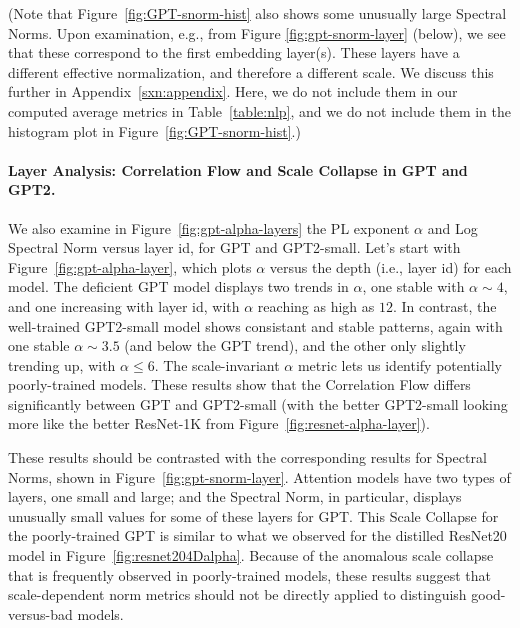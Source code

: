 (Note that Figure~\ref{fig:GPT-snorm-hist} also shows some unusually large Spectral Norms.
Upon examination, e.g., from Figure \ref{fig:gpt-snorm-layer} (below), we see that these correspond to the first embedding layer(s).
These layers have a different effective normalization, and therefore a different scale.
We discuss this further in Appendix~\ref{sxn:appendix}.
Here, we do not include them in our computed average metrics in Table~\ref{table:nlp}, and we do not include them in the histogram plot in Figure~\ref{fig:GPT-snorm-hist}.)



\paragraph{Layer Analysis: Correlation Flow and Scale Collapse in GPT and GPT2.} 

We also examine in Figure~\ref{fig:gpt-alpha-layers} the PL exponent $\alpha$ and Log Spectral Norm versus layer id, for GPT and GPT2-small.
Let's start with Figure~\ref{fig:gpt-alpha-layer}, which plots $\alpha$ versus the depth (i.e., layer id) for each model.
The deficient GPT model displays two trends in $\alpha$, one stable with $\alpha\sim 4$, and one increasing with layer id, with $\alpha$ reaching as high as $12$.
In contrast, the well-trained GPT2-small model shows consistant and stable patterns, again with one stable $\alpha\sim 3.5$ (and below the GPT trend), and the other only slightly trending up, with $\alpha\le 6$. 
The scale-invariant $\alpha$ metric lets us identify potentially poorly-trained models.
These results show that the Correlation Flow differs significantly between GPT and GPT2-small (with the better GPT2-small looking more like the better ResNet-1K from Figure~\ref{fig:resnet-alpha-layer}).

These results should be contrasted with the corresponding results for Spectral Norms, shown in Figure~\ref{fig:gpt-snorm-layer}.
Attention models have two types of layers, one small and large; and the Spectral Norm, in particular, displays unusually small values for some of these layers for GPT.
This Scale Collapse for the poorly-trained GPT is similar to what we observed for the distilled ResNet20 model in Figure~\ref{fig:resnet204Dalpha}.
Because of the anomalous scale collapse that is frequently observed in poorly-trained models, these results suggest that scale-dependent norm metrics should not be directly applied to distinguish good-versus-bad models. 


